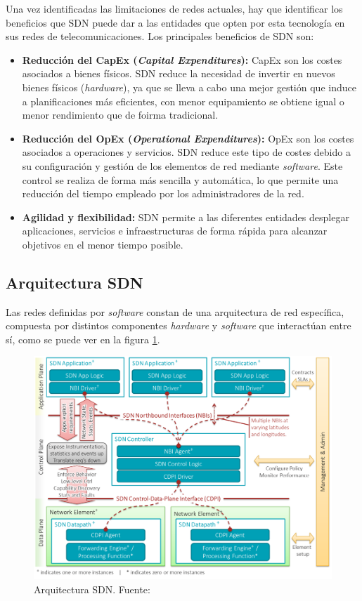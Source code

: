 Una vez identificadas las limitaciones de redes actuales, hay que identificar los beneficios que SDN puede dar a las entidades que opten por esta tecnología en sus redes de telecomunicaciones. Los principales beneficios de SDN son:

\begin{itemize}
	\item \textbf{Reducción del CapEx (\textit{Capital Expenditures}):} CapEx son los costes asociados a bienes físicos. SDN reduce la necesidad de invertir en nuevos bienes físicos (\textit{hardware}), ya que se lleva a cabo una mejor gestión que induce a planificaciones más eficientes, con menor equipamiento se obtiene igual o menor rendimiento que de foirma tradicional.
	
	\item \textbf{Reducción del OpEx (\textit{Operational Expenditures}):} OpEx son los costes asociados a operaciones y servicios. SDN reduce este tipo de costes debido a su configuración y gestión de los elementos de red mediante \textit{software}. Este control se realiza de forma más sencilla y automática, lo que permite una reducción del tiempo empleado por los administradores de la red.
	
	\item \textbf{Agilidad y flexibilidad:} SDN permite a las diferentes entidades desplegar aplicaciones, servicios e infraestructuras de forma rápida para alcanzar objetivos en el menor tiempo posible.
\end{itemize}

\subsection{Arquitectura SDN}

Las redes definidas por \textit{software} constan de una arquitectura de red específica, compuesta por distintos componentes \textit{hardware} y \textit{software} que interactúan entre sí, como se puede ver en la figura \ref{fig:arquitecturasdn}.
 
\begin{figure}[!ht]
	\centering
	\includegraphics[width=0.75\linewidth]{imagenes/arquitectura_sdn}
	\caption{Arquitectura SDN. Fuente:\cite{sdnbib}}
	\label{fig:arquitecturasdn}
\end{figure}

